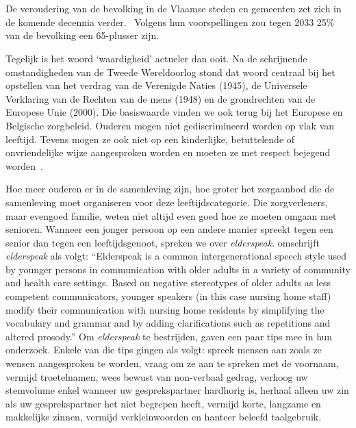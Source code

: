 
\chapter{}
\label{ch:inleiding}

De veroudering van de bevolking in de Vlaamse steden en gemeenten zet zich in de komende decennia verder.~\autocite{StatistiekVlaanderen2018}
Volgens hun voorspellingen zou tegen 2033 25\% van de bevolking een 65-plusser zijn.

Tegelijk is het woord `waardigheid' actueler dan ooit.
Na de schrijnende omstandigheden van de Tweede Wereldoorlog stond dat woord centraal bij het opstellen van het verdrag van de Verenigde Naties (1945), de Universele Verklaring van de Rechten van de mens (1948) en de grondrechten van de Europese Unie (2000).
Die basiswaarde vinden we ook terug bij het Europese en Belgische zorgbeleid. Ouderen mogen niet gediscrimineerd worden op vlak van leeftijd. Tevens mogen ze ook niet op een kinderlijke, betuttelende of onvriendelijke wijze aangesproken worden en moeten ze met respect bejegend worden~\autocite{Campens2021}.

Hoe meer ouderen er in de samenleving zijn, hoe groter het zorgaanbod die de samenleving moet organiseren voor deze leeftijdscategorie.
Die zorgverleners, maar evengoed familie, weten niet altijd even goed hoe ze moeten omgaan met senioren.
Wanneer een jonger persoon op een andere manier spreekt tegen een senior dan tegen een leeftijdsgenoot, spreken we over \textit{elderspeak}. \textcite{Williams2011} omschrijft \textit{elderspeak} als volgt: ``Elderspeak is a common intergenerational speech style used by younger persons in communication with older adults in a variety of community and health care settings. Based on negative stereotypes of older adults as less competent communicators, younger speakers (in this case nursing home staff) modify their communication with nursing home residents by simplifying the vocabulary and grammar and by adding clarifications such as repetitions and altered prosody.'' Om \textit{elderspeak} te bestrijden, gaven \textcite{Wick2007} een paar tips mee in hun onderzoek.
Enkele van die tips gingen als volgt: spreek mensen aan zoals ze wensen aangesproken te worden, vraag om ze aan te spreken met de voornaam, vermijd troetelnamen, wees bewust van non-verbaal gedrag, verhoog uw stemvolume enkel wanneer uw gesprekspartner hardhorig is, herhaal alleen uw zin als uw gesprekspartner het niet begrepen heeft, vermijd korte, langzame en makkelijke zinnen, vermijd verkleinwoorden en hanteer beleefd taalgebruik.

